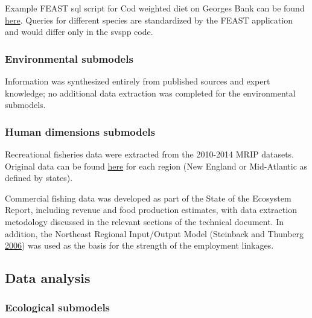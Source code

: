 \documentclass[
]{book}
\begin{document}
Example FEAST sql script for Cod weighted diet on Georges Bank can be found \href{https://github.com/NOAA-EDAB/tech-doc/tree/master/R/stored_scripts/conceptual_models_extraction.sql}{here}.
Queries for different species are standardized by the FEAST application and would differ only in the svspp code.

\hypertarget{environmental-submodels-1}{%
\subsubsection{Environmental submodels}\label{environmental-submodels-1}}

Information was synthesized entirely from published sources and expert knowledge; no additional data extraction was completed for the environmental submodels.

\hypertarget{human-dimensions-submodels-1}{%
\subsubsection{Human dimensions submodels}\label{human-dimensions-submodels-1}}

Recreational fisheries data were extracted from the 2010-2014 MRIP datasets. Original data can be found \href{data/top10_prim1_common_mode.xlsx}{here} for each region (New England or Mid-Atlantic as defined by states).

Commercial fishing data was developed as part of the State of the Ecosystem Report, including revenue and food production estimates, with data extraction metodology discussed in the relevant sections of the technical document. In addition, the Northeast Regional Input/Output Model (Steinback and Thunberg \protect\hyperlink{ref-steinback_scott_northeast_2006}{2006}) was used as the basis for the strength of the employment linkages.

\hypertarget{data-analysis-10}{%
\subsection{Data analysis}\label{data-analysis-10}}

\hypertarget{ecological-submodels-2}{%
\subsubsection{Ecological submodels}\label{ecological-submodels-2}}
\end{document}
